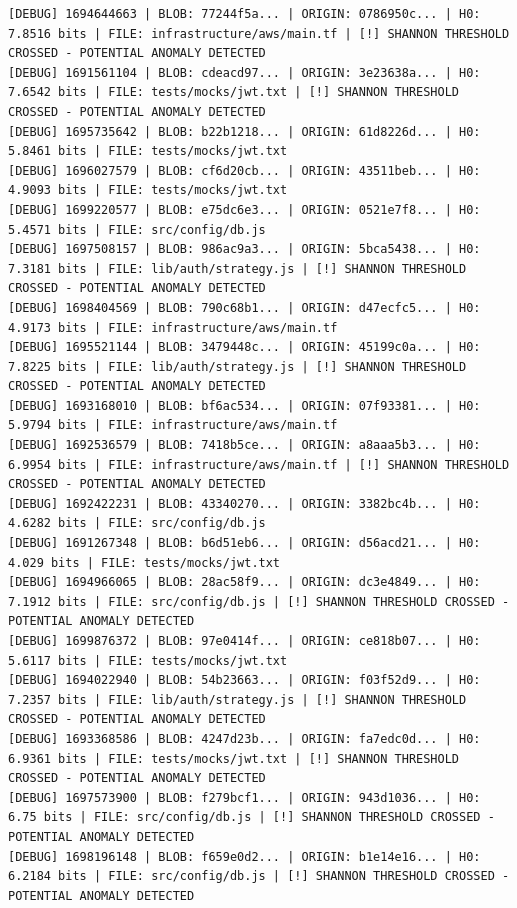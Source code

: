 \documentclass[12pt, a4paper, oneside]{report}
\begin{document}
\begin{lstlisting}[basicstyle=\tiny\ttfamily]
[DEBUG] 1694644663 | BLOB: 77244f5a... | ORIGIN: 0786950c... | H0: 7.8516 bits | FILE: infrastructure/aws/main.tf | [!] SHANNON THRESHOLD CROSSED - POTENTIAL ANOMALY DETECTED
[DEBUG] 1691561104 | BLOB: cdeacd97... | ORIGIN: 3e23638a... | H0: 7.6542 bits | FILE: tests/mocks/jwt.txt | [!] SHANNON THRESHOLD CROSSED - POTENTIAL ANOMALY DETECTED
[DEBUG] 1695735642 | BLOB: b22b1218... | ORIGIN: 61d8226d... | H0: 5.8461 bits | FILE: tests/mocks/jwt.txt
[DEBUG] 1696027579 | BLOB: cf6d20cb... | ORIGIN: 43511beb... | H0: 4.9093 bits | FILE: tests/mocks/jwt.txt
[DEBUG] 1699220577 | BLOB: e75dc6e3... | ORIGIN: 0521e7f8... | H0: 5.4571 bits | FILE: src/config/db.js
[DEBUG] 1697508157 | BLOB: 986ac9a3... | ORIGIN: 5bca5438... | H0: 7.3181 bits | FILE: lib/auth/strategy.js | [!] SHANNON THRESHOLD CROSSED - POTENTIAL ANOMALY DETECTED
[DEBUG] 1698404569 | BLOB: 790c68b1... | ORIGIN: d47ecfc5... | H0: 4.9173 bits | FILE: infrastructure/aws/main.tf
[DEBUG] 1695521144 | BLOB: 3479448c... | ORIGIN: 45199c0a... | H0: 7.8225 bits | FILE: lib/auth/strategy.js | [!] SHANNON THRESHOLD CROSSED - POTENTIAL ANOMALY DETECTED
[DEBUG] 1693168010 | BLOB: bf6ac534... | ORIGIN: 07f93381... | H0: 5.9794 bits | FILE: infrastructure/aws/main.tf
[DEBUG] 1692536579 | BLOB: 7418b5ce... | ORIGIN: a8aaa5b3... | H0: 6.9954 bits | FILE: infrastructure/aws/main.tf | [!] SHANNON THRESHOLD CROSSED - POTENTIAL ANOMALY DETECTED
[DEBUG] 1692422231 | BLOB: 43340270... | ORIGIN: 3382bc4b... | H0: 4.6282 bits | FILE: src/config/db.js
[DEBUG] 1691267348 | BLOB: b6d51eb6... | ORIGIN: d56acd21... | H0: 4.029 bits | FILE: tests/mocks/jwt.txt
[DEBUG] 1694966065 | BLOB: 28ac58f9... | ORIGIN: dc3e4849... | H0: 7.1912 bits | FILE: src/config/db.js | [!] SHANNON THRESHOLD CROSSED - POTENTIAL ANOMALY DETECTED
[DEBUG] 1699876372 | BLOB: 97e0414f... | ORIGIN: ce818b07... | H0: 5.6117 bits | FILE: tests/mocks/jwt.txt
[DEBUG] 1694022940 | BLOB: 54b23663... | ORIGIN: f03f52d9... | H0: 7.2357 bits | FILE: lib/auth/strategy.js | [!] SHANNON THRESHOLD CROSSED - POTENTIAL ANOMALY DETECTED
[DEBUG] 1693368586 | BLOB: 4247d23b... | ORIGIN: fa7edc0d... | H0: 6.9361 bits | FILE: tests/mocks/jwt.txt | [!] SHANNON THRESHOLD CROSSED - POTENTIAL ANOMALY DETECTED
[DEBUG] 1697573900 | BLOB: f279bcf1... | ORIGIN: 943d1036... | H0: 6.75 bits | FILE: src/config/db.js | [!] SHANNON THRESHOLD CROSSED - POTENTIAL ANOMALY DETECTED
[DEBUG] 1698196148 | BLOB: f659e0d2... | ORIGIN: b1e14e16... | H0: 6.2184 bits | FILE: src/config/db.js | [!] SHANNON THRESHOLD CROSSED - POTENTIAL ANOMALY DETECTED

\end{lstlisting}
\end{document}
